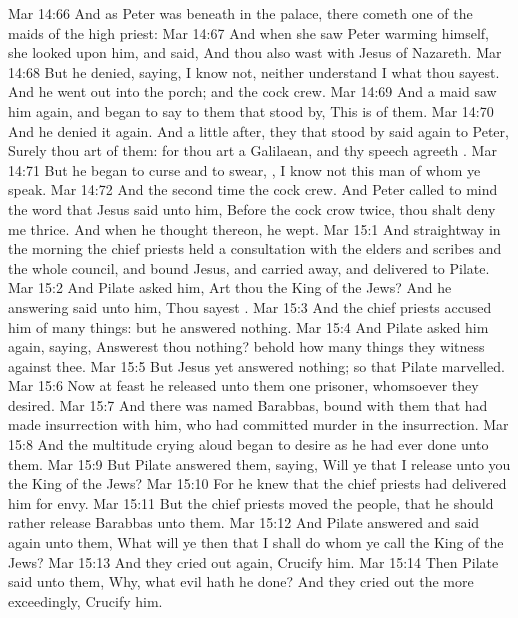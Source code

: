 \vs Mar 14:66 And as Peter was beneath in the palace, there cometh one of the maids of the high priest:
\vs Mar 14:67 And when she saw Peter warming himself, she looked upon him, and said, And thou also wast with Jesus of Nazareth.
\vs Mar 14:68 But he denied, saying, I know not, neither understand I what thou sayest. And he went out into the porch; and the cock crew.
\vs Mar 14:69 And a maid saw him again, and began to say to them that stood by, This is  of them.
\vs Mar 14:70 And he denied it again. And a little after, they that stood by said again to Peter, Surely thou art  of them: for thou art a Galilaean, and thy speech agreeth .
\vs Mar 14:71 But he began to curse and to swear, , I know not this man of whom ye speak.
\vs Mar 14:72 And the second time the cock crew. And Peter called to mind the word that Jesus said unto him, Before the cock crow twice, thou shalt deny me thrice. And when he thought thereon, he wept.
\vs Mar 15:1 And straightway in the morning the chief priests held a consultation with the elders and scribes and the whole council, and bound Jesus, and carried  away, and delivered  to Pilate.
\vs Mar 15:2 And Pilate asked him, Art thou the King of the Jews? And he answering said unto him, Thou sayest .
\vs Mar 15:3 And the chief priests accused him of many things: but he answered nothing.
\vs Mar 15:4 And Pilate asked him again, saying, Answerest thou nothing? behold how many things they witness against thee.
\vs Mar 15:5 But Jesus yet answered nothing; so that Pilate marvelled.
\vs Mar 15:6 Now at  feast he released unto them one prisoner, whomsoever they desired.
\vs Mar 15:7 And there was  named Barabbas,  bound with them that had made insurrection with him, who had committed murder in the insurrection.
\vs Mar 15:8 And the multitude crying aloud began to desire  as he had ever done unto them.
\vs Mar 15:9 But Pilate answered them, saying, Will ye that I release unto you the King of the Jews?
\vs Mar 15:10 For he knew that the chief priests had delivered him for envy.
\vs Mar 15:11 But the chief priests moved the people, that he should rather release Barabbas unto them.
\vs Mar 15:12 And Pilate answered and said again unto them, What will ye then that I shall do  whom ye call the King of the Jews?
\vs Mar 15:13 And they cried out again, Crucify him.
\vs Mar 15:14 Then Pilate said unto them, Why, what evil hath he done? And they cried out the more exceedingly, Crucify him.
